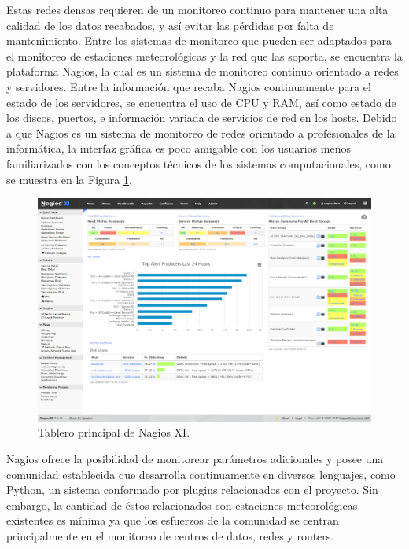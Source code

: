 
Estas redes densas requieren de un monitoreo continuo para mantener una alta calidad de los datos recabados, y así evitar las pérdidas por falta de mantenimiento. Entre los sistemas de monitoreo que pueden ser adaptados para el monitoreo de estaciones meteorológicas y la red que las soporta, se encuentra la plataforma Nagios, la cual es un sistema de monitoreo continuo orientado a redes y servidores. Entre la información que recaba Nagios continuamente para el estado de los servidores, se encuentra el uso de CPU y RAM, así como estado de los discos, puertos, e información variada de servicios de red en los hosts. Debido a que Nagios es un sistema de monitoreo de redes orientado a profesionales de la informática, la interfaz gráfica es poco amigable con los usuarios menos familiarizados con los conceptos técnicos de los sistemas computacionales, como se muestra en la Figura \ref{fig:nagios_dashboard}.

\begin{figure}[!ht]
	\centering
	\includegraphics[width=1\linewidth]{images/Nagios_home_dashboard.png}
	\caption{Tablero principal de Nagios XI.}
	\label{fig:nagios_dashboard}
\end{figure}

Nagios ofrece la posibilidad de monitorear parámetros adicionales y posee una comunidad establecida que desarrolla continuamente en diversos lenguajes, como Python, un sistema conformado por plugins relacionados con el proyecto. Sin embargo, la cantidad de éstos relacionados con estaciones meteorológicas existentes es mínima ya que los esfuerzos de la comunidad se centran principalmente en el monitoreo de centros de datos, redes y routers.

